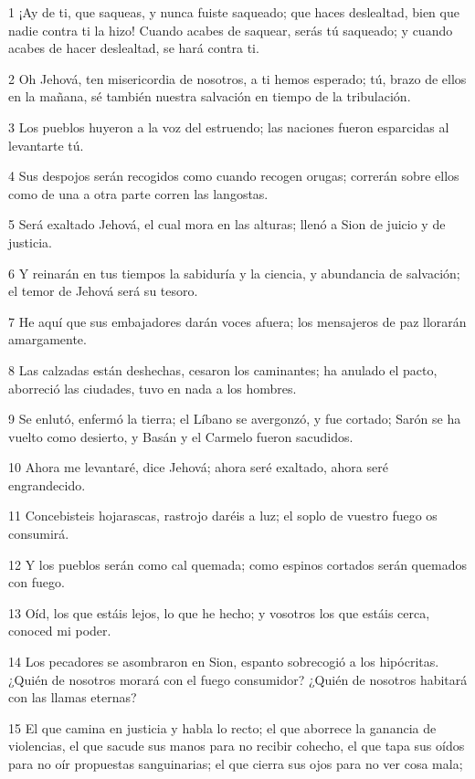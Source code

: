 \par 1 ¡Ay de ti, que saqueas, y nunca fuiste saqueado; que haces deslealtad, bien que nadie contra ti la hizo! Cuando acabes de saquear, serás tú saqueado; y cuando acabes de hacer deslealtad, se hará contra ti.
\par 2 Oh Jehová, ten misericordia de nosotros, a ti hemos esperado; tú, brazo de ellos en la mañana, sé también nuestra salvación en tiempo de la tribulación.
\par 3 Los pueblos huyeron a la voz del estruendo; las naciones fueron esparcidas al levantarte tú.
\par 4 Sus despojos serán recogidos como cuando recogen orugas; correrán sobre ellos como de una a otra parte corren las langostas.
\par 5 Será exaltado Jehová, el cual mora en las alturas; llenó a Sion de juicio y de justicia.
\par 6 Y reinarán en tus tiempos la sabiduría y la ciencia, y abundancia de salvación; el temor de Jehová será su tesoro.
\par 7 He aquí que sus embajadores darán voces afuera; los mensajeros de paz llorarán amargamente.
\par 8 Las calzadas están deshechas, cesaron los caminantes; ha anulado el pacto, aborreció las ciudades, tuvo en nada a los hombres.
\par 9 Se enlutó, enfermó la tierra; el Líbano se avergonzó, y fue cortado; Sarón se ha vuelto como desierto, y Basán y el Carmelo fueron sacudidos.
\par 10 Ahora me levantaré, dice Jehová; ahora seré exaltado, ahora seré engrandecido.
\par 11 Concebisteis hojarascas, rastrojo daréis a luz; el soplo de vuestro fuego os consumirá.
\par 12 Y los pueblos serán como cal quemada; como espinos cortados serán quemados con fuego.
\par 13 Oíd, los que estáis lejos, lo que he hecho; y vosotros los que estáis cerca, conoced mi poder.
\par 14 Los pecadores se asombraron en Sion, espanto sobrecogió a los hipócritas. ¿Quién de nosotros morará con el fuego consumidor? ¿Quién de nosotros habitará con las llamas eternas?
\par 15 El que camina en justicia y habla lo recto; el que aborrece la ganancia de violencias, el que sacude sus manos para no recibir cohecho, el que tapa sus oídos para no oír propuestas sanguinarias; el que cierra sus ojos para no ver cosa mala;
